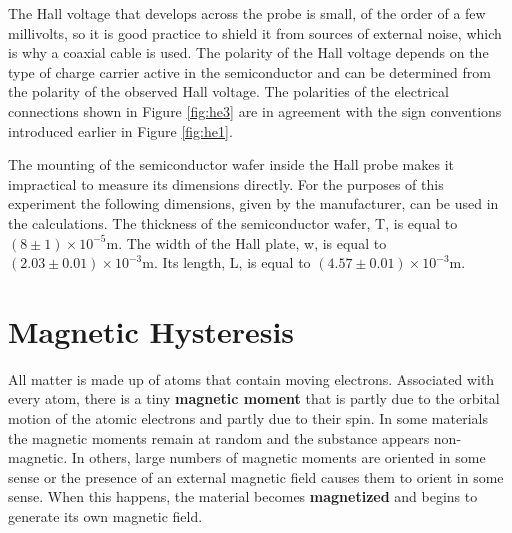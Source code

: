 The Hall voltage that develops across the probe is small, of the order of a few millivolts, so it is good practice to shield it from sources of external noise, which is why a coaxial cable is used. The polarity of the Hall voltage depends on the type of charge carrier active in the semiconductor and can be determined from the polarity of the observed Hall voltage. The polarities of the electrical connections shown in Figure \ref{fig:he3} are in agreement with the sign conventions introduced earlier in Figure \ref{fig:he1}.

The mounting of the semiconductor wafer inside the Hall probe makes it impractical to measure its dimensions directly. For the purposes of this experiment the following dimensions, given by the manufacturer, can be used in the calculations. The thickness of the semiconductor wafer, T, is equal to $(8\pm 1)\times10^{-5}$m. The width of the Hall plate, w, is equal to $(2.03\pm0.01)\times10^{-3}$m. Its length, L, is equal to $(4.57\pm0.01)\times10^{-3}$m.

\section{Magnetic Hysteresis}

All matter is made up of atoms that contain moving electrons. Associated with every atom, there is a tiny {\bf magnetic moment} that is partly due to the orbital motion of the atomic electrons and partly due to their spin. In some materials the magnetic moments remain at random and the substance appears non-magnetic. In others, large numbers of magnetic moments are oriented in some sense or the presence of an external magnetic field causes them to orient in some sense. When this happens, the material becomes {\bf magnetized} and begins to generate its own magnetic field. 

